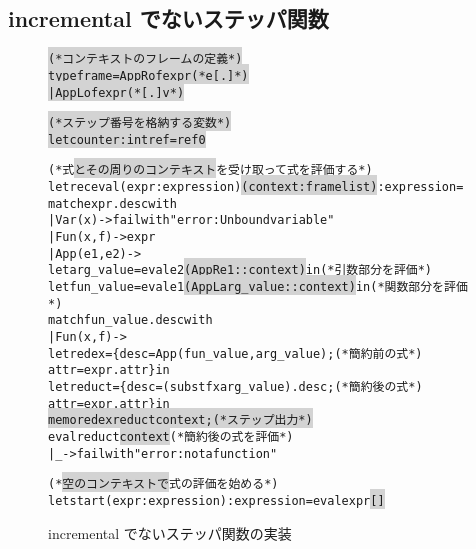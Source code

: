 \subsection{incremental でないステッパ関数}

\begin{figure}[t]
\begin{spacing}{0.8}
  \begin{alltt}
\colorbox{lightgray}{(* コンテキストのフレームの定義 *)}
\colorbox{lightgray}{type frame = AppR of expr  (* e [.] *)}
\colorbox{lightgray}{           | AppL of expr  (* [.] v *)}

\colorbox{lightgray}{(* ステップ番号を格納する変数 *)}
\colorbox{lightgray}{let counter : int ref = ref 0}

(* 式\colorbox{lightgray}{とその周りのコンテキスト}を受け取って式を評価する *)
let rec eval (expr : expression) \colorbox{lightgray}{(context : frame list)} : expression =
  match expr.desc with
    | Var (x) -> failwith "error: Unbound variable"
    | Fun (x, f) -> expr
    | App (e1, e2) ->
      let arg\_value = eval e2 \colorbox{lightgray}{(AppR e1 :: context)} in       (* 引数部分を評価 *)
      let fun\_value = eval e1 \colorbox{lightgray}{(AppL arg\_value :: context)} in(* 関数部分を評価 *)
      match fun\_value.desc with
        | Fun (x, f) ->
          let redex = \{desc = App (fun\_value, arg\_value);       (* 簡約前の式 *)
                      attr = expr.attr\} in
          let reduct = \{desc = (subst f x arg\_value).desc ;     (* 簡約後の式 *)
                        attr = expr.attr\} in
          \colorbox{lightgray}{memo redex reduct context;                          (* ステップ出力 *)}
          eval reduct \colorbox{lightgray}{context}                             (* 簡約後の式を評価 *)
        | \_ -> failwith "error: not a function"

(* \colorbox{lightgray}{空のコンテキストで}式の評価を始める *)
let start (expr : expression) : expression = eval expr \colorbox{lightgray}{[]}
\end{alltt}
\end{spacing}
\caption{incremental でないステッパ関数の実装}
\label{figure:old-stepper}
\end{figure}

